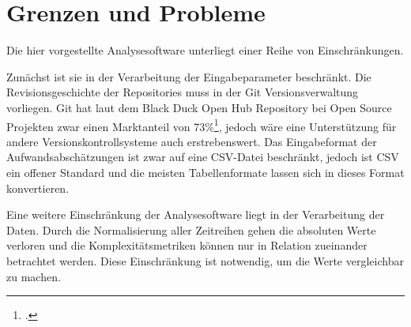 \section{Grenzen und Probleme}\label{grenzen-und-probleme}

Die hier vorgestellte Analysesoftware unterliegt einer Reihe von
Einschränkungen.

Zunächst ist sie in der Verarbeitung der Eingabeparameter beschränkt.
Die Revisionsgeschichte der Repositories muss in der Git
Versionsverwaltung vorliegen. Git hat laut dem Black Duck Open Hub
Repository bei Open Source Projekten zwar einen Marktanteil von
73\%\footcite[Vgl. ][]{CompareRepositoriesOpen}, jedoch wäre eine Unterstützung
für andere Versionskontrollsysteme auch erstrebenswert. Das
Eingabeformat der Aufwandsabschätzungen ist zwar auf eine CSV-Datei
beschränkt, jedoch ist CSV ein offener Standard und die meisten
Tabellenformate lassen sich in dieses Format konvertieren.

Eine weitere Einschränkung der Analysesoftware liegt in der Verarbeitung
der Daten. Durch die Normalisierung aller Zeitreihen gehen die absoluten
Werte verloren und die Komplexitätsmetriken können nur in Relation
zueinander betrachtet werden. Diese Einschränkung ist notwendig, um die
Werte vergleichbar zu machen.

